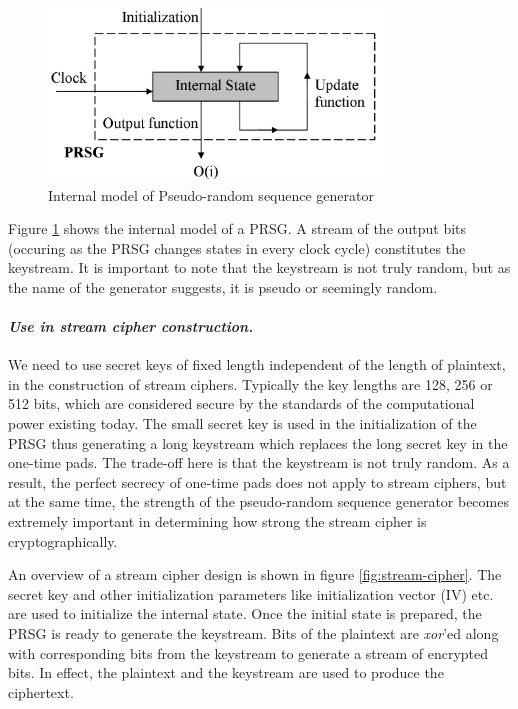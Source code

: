 \begin{figure}[ht!]
	\centering
		\includegraphics[width=3.5in]{./figures/prsg.PNG}
	\caption{Internal model of Pseudo-random sequence generator}	
	\label{fig:prsg}
\end{figure}

Figure \ref{fig:prsg} shows the internal model of a PRSG. A stream of the output bits (occuring as the PRSG changes states in every clock cycle) constitutes the keystream. It is important to note that the keystream is not truly random, but as the name of the generator suggests, it is pseudo or seemingly random. 

\paragraph{\textit{Use in stream cipher construction.}}
\label{para:stream-construction} 
We need to use secret keys of fixed length independent of the length of plaintext, in the construction of stream ciphers. Typically the key lengths are 128, 256 or 512 bits, which are considered secure by the standards of the computational power existing today. 
The small secret key is used in the initialization of the PRSG thus generating a long keystream which replaces the long secret key in the one-time pads. The trade-off here is that the keystream is not truly random. As a result, the perfect secrecy of one-time pads does not apply to stream ciphers, but at the same time, the strength of the pseudo-random sequence generator becomes extremely important in determining how strong the stream cipher is cryptographically.

An overview of a stream cipher design is shown in figure \ref{fig:stream-cipher}. The secret key and other initialization parameters like initialization vector (IV) etc. are used to initialize the internal state. Once the initial state is prepared, the PRSG is ready to generate the keystream. Bits of the plaintext are \emph{xor}'ed along with corresponding bits from the keystream to generate a stream of encrypted bits. In effect, the plaintext and the keystream are used to produce the ciphertext.

